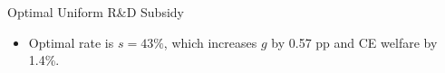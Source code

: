 \documentclass[
  10pt,
  aspectratio=169,   %
]{beamer}
\theoremstyle{plain}
\begin{document}
\begin{frame}{Optimal Uniform R\&D Subsidy}
  \begin{center}
    \begin{figure}
      \centering
      \setcounter{subfigure}{0}
    \end{figure}
  \end{center}
  \begin{itemize}
    \item Optimal rate is $s=43\%$, which increases $g$ by 0.57 pp and CE welfare by 1.4\%.
  \end{itemize}
\end{frame}
\end{document}
